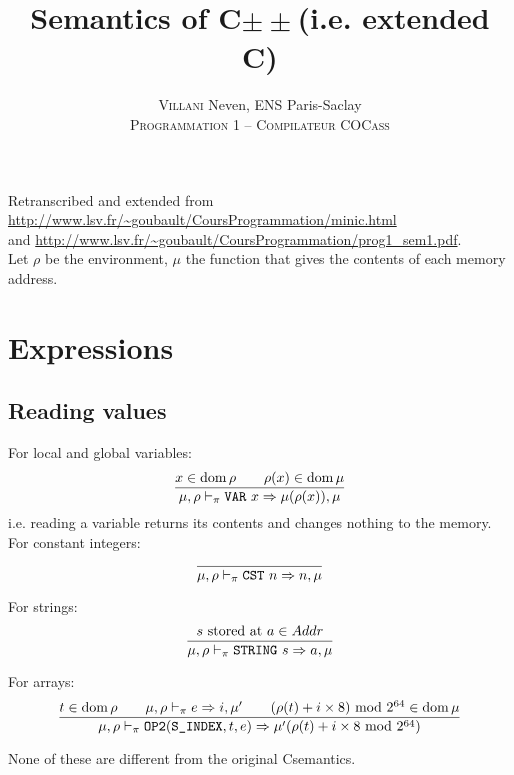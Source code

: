 

\newcommand{\Cpm}{C\(\pm\pm\)}
\newcommand{\Cmm}{C\textminus\textminus}

\title{Semantics of \Cpm (i.e. extended \Cmm)}
\author{\textsc{Villani} Neven, ENS Paris-Saclay\\\textsc{Programmation 1 -- Compilateur COCass}}


\maketitle

Retranscribed and extended from \url{http://www.lsv.fr/~goubault/CoursProgrammation/minic.html}\\
and \url{http://www.lsv.fr/~goubault/CoursProgrammation/prog1_sem1.pdf}.\\

Let \(\rho\) be the environment, \(\mu\) the function that gives the contents of each memory address.\\

\section{Expressions}
\subsection{Reading values}

For local and global variables:
\[\dfrac{x\in\operatorname{dom}\rho \qquad \rho(x)\in\operatorname{dom}\mu}{\mu,\rho\vdash_\pi \texttt{VAR}\ x\Rightarrow \mu(\rho(x)), \mu}\]
i.e. reading a variable returns its contents and changes nothing to the memory.\\

For constant integers:
\[\dfrac{}{\mu,\rho\vdash_\pi \texttt{CST}\ n\Rightarrow n, \mu}\]

For strings:
\[\dfrac{s\text{ stored at }a\in Addr}{\mu,\rho\vdash_\pi \texttt{STRING}\ s\Rightarrow a, \mu}\]

For arrays:
\[\dfrac{t\in\operatorname{dom}\rho \qquad \mu,\rho\vdash_\pi e\Rightarrow i,\mu' \qquad (\rho(t)+i\times 8)\text{ mod } 2^{64}\in\operatorname{dom}\mu}{\mu,\rho\vdash_\pi \texttt{OP2}(\texttt{S\_INDEX}, t, e) \Rightarrow \mu'(\rho(t)+i\times 8 \text{ mod } 2^{64})}\]

None of these are different from the original \Cmm semantics.


